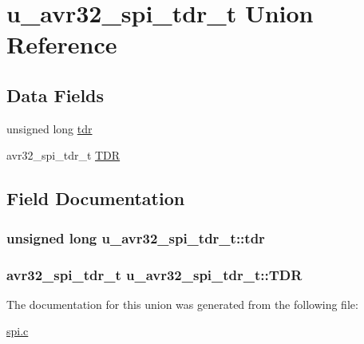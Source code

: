 \hypertarget{unionu__avr32__spi__tdr__t}{
\section{u\-\_\-avr32\-\_\-spi\-\_\-tdr\-\_\-t \-Union \-Reference}
\label{unionu__avr32__spi__tdr__t}
}
\subsection*{\-Data \-Fields}
\begin{DoxyCompactItemize}
\item 
unsigned long \hyperlink{unionu__avr32__spi__tdr__t_a778b01c8c5c2e0fb1ad5b062b15c270c}{tdr}
\item 
avr32\-\_\-spi\-\_\-tdr\-\_\-t \hyperlink{unionu__avr32__spi__tdr__t_a425da47da39981295bab04c5b8b0d344}{\-T\-D\-R}
\end{DoxyCompactItemize}


\subsection{\-Field \-Documentation}
\hypertarget{unionu__avr32__spi__tdr__t_a778b01c8c5c2e0fb1ad5b062b15c270c}{
\subsubsection[{tdr}]{\setlength{\rightskip}{0pt plus 5cm}unsigned long {\bf u\-\_\-avr32\-\_\-spi\-\_\-tdr\-\_\-t\-::tdr}}}
\label{unionu__avr32__spi__tdr__t_a778b01c8c5c2e0fb1ad5b062b15c270c}
\hypertarget{unionu__avr32__spi__tdr__t_a425da47da39981295bab04c5b8b0d344}{
\subsubsection[{\-T\-D\-R}]{\setlength{\rightskip}{0pt plus 5cm}avr32\-\_\-spi\-\_\-tdr\-\_\-t {\bf u\-\_\-avr32\-\_\-spi\-\_\-tdr\-\_\-t\-::\-T\-D\-R}}}
\label{unionu__avr32__spi__tdr__t_a425da47da39981295bab04c5b8b0d344}


\-The documentation for this union was generated from the following file\-:\begin{DoxyCompactItemize}
\item 
\hyperlink{spi_8c}{spi.\-c}\end{DoxyCompactItemize}
